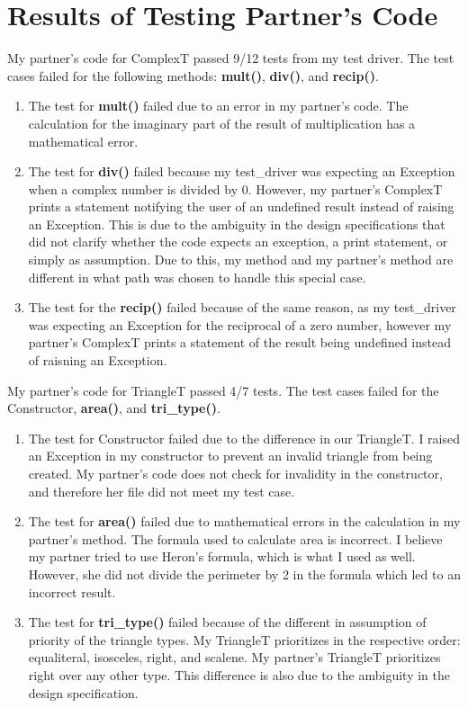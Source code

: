\documentclass[12pt]{article}
\begin{document}
\section{Results of Testing Partner's Code}
\noindent My partner's code for ComplexT passed 9/12 tests from my test driver. The test cases failed for the following methods: \textbf{mult()}, \textbf{div()}, and \textbf{recip()}. 
\begin{enumerate}
\item The test for \textbf{mult()} failed due to an error in my partner's code. The calculation for the imaginary part of the result of multiplication has a mathematical error.
\item The test for \textbf{div()} failed because my test\_driver was expecting an Exception when a complex number is divided by 0. However, my partner's ComplexT prints a statement notifying the user of an undefined result instead of raising an Exception. This is due to the ambiguity in the design specifications that did not clarify whether the code expects an exception, a print statement, or simply as assumption. Due to this, my method and my partner's method are different in what path was chosen to handle this special case.
\item The test for the \textbf{recip()} failed because of the same reason, as my test\_driver was expecting an Exception for the reciprocal of a zero number, however my partner's ComplexT prints a statement of the result being undefined instead of raisning an Exception.
\end{enumerate}
My partner's code for TriangleT passed 4/7 tests. The test cases failed for the Constructor, \textbf{area()}, and \textbf{tri\_type()}. 
\begin{enumerate}
\item The test for Constructor failed due to the difference in our TriangleT. I raised an Exception in my constructor to prevent an invalid triangle from being created. My partner's code does not check for invalidity in the constructor, and therefore her file did not meet my test case.
\item The test for \textbf{area()} failed due to mathematical errors in the calculation in my partner's method. The formula used to calculate area is incorrect. I believe my partner tried to use Heron's formula, which is what I used as well. However, she did not divide the perimeter by 2 in the formula which led to an incorrect result.
\item The test for \textbf{tri\_type()} failed because of the different in assumption of priority of the triangle types. My TriangleT prioritizes in the respective order: equaliteral, isosceles, right, and scalene. My partner's TriangleT prioritizes right over any other type. This difference is also due to the ambiguity in the design specification. 
\end{enumerate}
\end{document}
